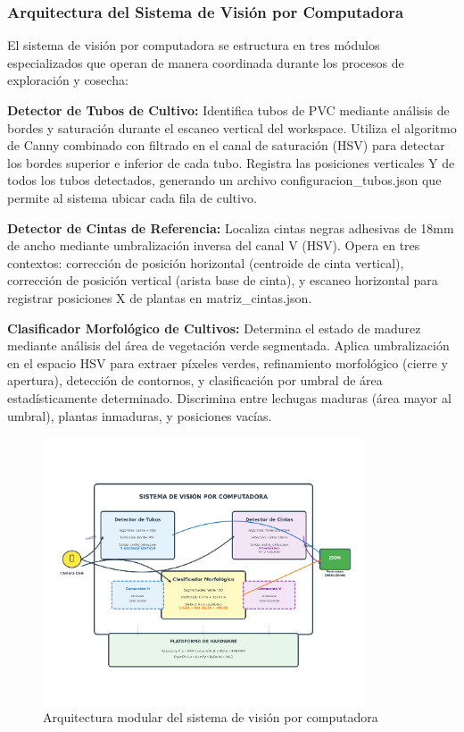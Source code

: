 \subsubsection{Arquitectura del Sistema de Visión por Computadora}

El sistema de visión por computadora se estructura en tres módulos especializados que operan de manera coordinada durante los procesos de exploración y cosecha:

\textbf{Detector de Tubos de Cultivo:} Identifica tubos de PVC mediante análisis de bordes y saturación durante el escaneo vertical del workspace. Utiliza el algoritmo de Canny combinado con filtrado en el canal de saturación (HSV) para detectar los bordes superior e inferior de cada tubo. Registra las posiciones verticales Y de todos los tubos detectados, generando un archivo configuracion\_tubos.json que permite al sistema ubicar cada fila de cultivo.

\textbf{Detector de Cintas de Referencia:} Localiza cintas negras adhesivas de 18mm de ancho mediante umbralización inversa del canal V (HSV). Opera en tres contextos: corrección de posición horizontal (centroide de cinta vertical), corrección de posición vertical (arista base de cinta), y escaneo horizontal para registrar posiciones X de plantas en matriz\_cintas.json.

\textbf{Clasificador Morfológico de Cultivos:} Determina el estado de madurez mediante análisis del área de vegetación verde segmentada. Aplica umbralización en el espacio HSV para extraer píxeles verdes, refinamiento morfológico (cierre y apertura), detección de contornos, y clasificación por umbral de área estadísticamente determinado. Discrimina entre lechugas maduras (área mayor al umbral), plantas inmaduras, y posiciones vacías.

\begin{figure}[h]
\centering
\includegraphics[width=0.85\textwidth]{imagenes/arquitectura_modular_vision.png}
\caption{Arquitectura modular del sistema de visión por computadora}
\label{fig:arquitectura_modular}
\end{figure}

